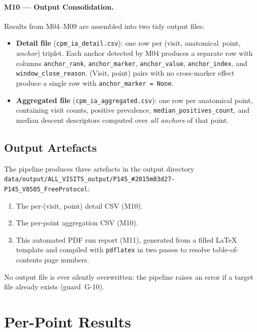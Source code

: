 \documentclass[a4paper,11pt]{article}
\begin{document}
\paragraph{M10 --- Output Consolidation.}
Results from M04--M09 are assembled into two tidy output files:
\begin{itemize}
  \item \textbf{Detail file} (\texttt{cpm\_ia\_detail.csv}): one row per
        (visit, anatomical~point, \emph{anchor}) triplet. Each anchor detected by M04
        produces a separate row with columns \texttt{anchor\_rank},
        \texttt{anchor\_marker}, \texttt{anchor\_value}, \texttt{anchor\_index},
        and \texttt{window\_close\_reason}.
        (Visit, point) pairs with no cross-marker effect produce a single row with
        \texttt{anchor\_marker = None}.
  \item \textbf{Aggregated file} (\texttt{cpm\_ia\_aggregated.csv}): one row per
        anatomical point, containing visit counts, positive prevalence,
        \texttt{median\_positives\_count}, and median descent descriptors computed over
        \emph{all anchors} of that point.
\end{itemize}

\subsection{Output Artefacts}

The pipeline produces three artefacts in the output directory \texttt{data/output/ALL\_VISITS\_output/P145\_\#2015m03d27-P145\_V8505\_FreeProtocol}:
\begin{enumerate}
  \item The per-(visit, point) detail CSV (M10).
  \item The per-point aggregation CSV (M10).
  \item This automated PDF run report (M11), generated from a filled \LaTeX{} template
        and compiled with \texttt{pdflatex} in two passes to resolve table-of-contents
        page numbers.
\end{enumerate}
No output file is ever silently overwritten: the pipeline raises an error if a target
file already exists (guard~G-10).

\section{Per-Point Results}
\end{document}
